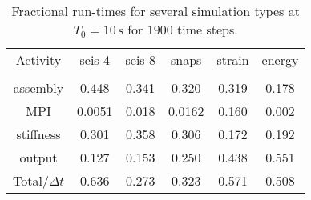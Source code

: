 \documentclass[11pt,letter,fleqn,english,notitlepage]{article}
\begin{document}
\begin{table}[b!]
\begin{center}
\caption{Fractional run-times for several simulation types at $T_0=10\, \textrm{s}$
for $1900$ time steps.}
\label{table:runtimes}
\begin{tabular}{@{}cccccc}
&&&\\
\hline\hline
Activity & seis 4 & seis 8 & snaps & strain  & energy \\
\hline\\
assembly & 0.448 & 0.341& 0.320 & 0.319 & 0.178  \\[10pt]
MPI & 0.0051 &  0.018 & 0.0162 & 0.160 & 0.002 \\[10pt]
stiffness &0.301 & 0.358 & 0.306 &0.172 & 0.192  \\[10pt]
output & 0.127 & 0.153  & 0.250  &0.438 &  0.551 \\[10pt]
Total/$\Delta t$ & 0.636 & 0.273 &  0.323&  0.571 &  0.508\\ [10pt]
%
\hline
\end{tabular}
\end{center}
\end{table}
%
\end{document}
